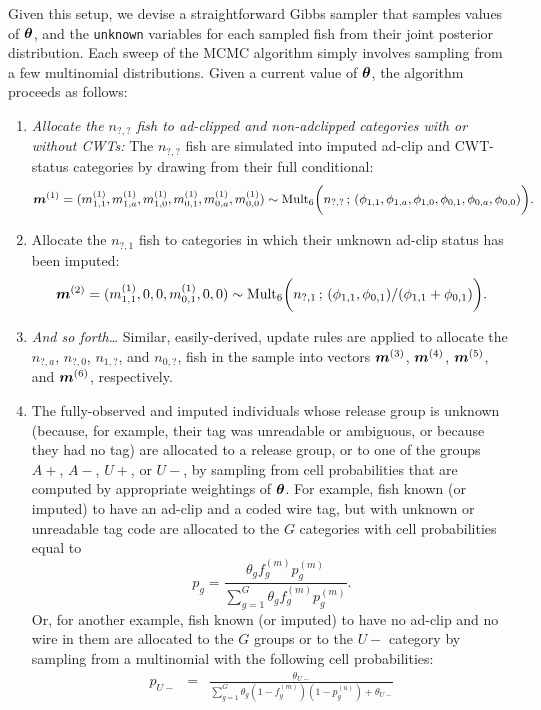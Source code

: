 \documentclass[11pt]{article}
\def\bm#1{\mathpalette\bmstyle{#1}}
\def\bmstyle#1#2{\mbox{\boldmath$#1#2$}}
\newcommand{\btheta}{\bm{\theta}}
\begin{document}
Given this setup, we devise a straightforward Gibbs sampler that samples values of $\btheta$, and the 
{\tt unknown} variables for each sampled fish from their joint posterior distribution. Each sweep of the MCMC
algorithm simply involves sampling from a few multinomial distributions.  Given a current value of $\btheta$, the
algorithm proceeds as follows:
\begin{enumerate}
\item {\em Allocate the $n_{?,?}$ fish to ad-clipped and non-adclipped categories with or without CWTs:} The $n_{?,?}$ fish are simulated into
imputed ad-clip and CWT-status categories by drawing from their full conditional:
\[
\bm{m}^{(1)} = 
(m^{(1)}_{1,1}, m^{(1)}_{1,a}, m^{(1)}_{1,0}, m^{(1)}_{0,1},  m^{(1)}_{0,a},  m^{(1)}_{0,0}) \sim 
\mathrm{Mult}_6\biggl(n_{?,?}\, ; \,(\phi_{1,1}, \phi_{1,a}, \phi_{1,0}, \phi_{0,1}, \phi_{0,a}, \phi_{0,0})\biggr).
\] 
\item Allocate the $n_{?,1}$ fish to categories in which their unknown ad-clip status has been imputed:
\[
\bm{m}^{(2)} = 
(m^{(1)}_{1,1}, 0, 0, m^{(1)}_{0,1},  0,  0) \sim 
\mathrm{Mult}_6\biggl(n_{?,1}\, ; \,(\phi_{1,1}, \phi_{0,1}) / (\phi_{1,1} + \phi_{0,1})\biggr).
\]
\item {\em And so forth\ldots}  Similar, easily-derived, update rules are applied to allocate the $n_{?,a}$, $n_{?,0}$, 
$n_{1,?}$, and $n_{0,?}$, fish in the sample into vectors $\bm{m}^{(3)}$, $\bm{m}^{(4)}$, $\bm{m}^{(5)}$, and $\bm{m}^{(6)}$, 
respectively. 
\item The fully-observed and imputed individuals whose release group is unknown 
(because, for example, their tag was unreadable or 
ambiguous, or because they had no tag) 
are allocated to a release group, or to one of the groups $A+$, $A-$, $U+$, or $U-$, by sampling from 
cell probabilities that are computed 
by appropriate weightings of $\btheta$. For example, fish known (or imputed) to have an ad-clip and a coded
wire tag, but with unknown or unreadable tag code are allocated to the $G$ categories with cell probabilities equal to
\[
p_g =  \frac{\theta_g f_g^{(m)}  p_g^{(m)}}
{\sum_{g=1}^G \theta_g f_g^{(m)}  p_g^{(m)}}.
\]
Or, for another example, fish known (or imputed) to have no ad-clip and no wire in them are allocated to the $G$ groups or to
the $U-$ category by sampling from a multinomial with the following cell probabilities:
\begin{eqnarray}
p_{U-} & = &  \frac{\theta_{U-}}{\sum_{g=1}^G \theta_g  (1 - f_g^{(m)}) (1 - p_g^{(u)}) + \theta_{U-}} \\

\end{eqnarray}
\end{enumerate}
\end{document}
